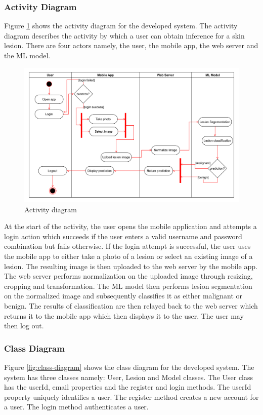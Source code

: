 \documentclass[12pt, a4paper]{article}
\begin{document}
\subsubsection{Activity Diagram}
Figure \ref{fig:activity-diagram} shows the activity diagram for the developed system. The activity diagram describes the activity by which a user can obtain inference for a skin lesion. There are four actors namely, the user, the mobile app, the web server and the ML model.
\begin{figure}[h]
    \centering
    \setlength{\fboxsep}{8pt}
    \includegraphics[scale=0.096, fbox]{activity-diagram.png}
    \caption{Activity diagram}
    \label{fig:activity-diagram}
\end{figure}

At the start of the activity, the user opens the mobile application and attempts a login action which succeeds if the user enters a valid username and password combination but fails otherwise. If the login attempt is successful, the user uses the mobile app to either take a photo of a lesion or select an existing image of a lesion. The resulting image is then uploaded to the web server by the mobile app. The web server performs normalization on the uploaded image through resizing, cropping and transformation. The ML model then performs lesion segmentation on the normalized image and subsequently classifies it as either malignant or benign. The results of classification are then relayed back to the web server which returns it to the mobile app which then displays it to the user. The user may then log out.
\subsubsection{Class Diagram}
Figure \ref{fig:class-diagram} shows the class diagram for the developed system. The system has three classes namely: User, Lesion and Model classes. The User class has the userId, email properties and the register and login methods. The userId property uniquely identifies a user. The register method creates a new account for a user. The login method authenticates a user.
\end{document}
